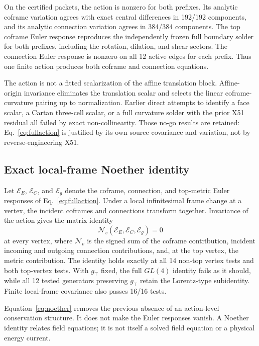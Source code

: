 \documentclass[11pt]{article}
\theoremstyle{definition}
\theoremstyle{remark}
\begin{document}
On the certified packets, the action is nonzero for both prefixes. Its analytic coframe variation agrees with exact central differences in 192/192 components, and its analytic connection variation agrees in 384/384 components. The top coframe Euler response reproduces the independently frozen full boundary solder for both prefixes, including the rotation, dilation, and shear sectors. The connection Euler response is nonzero on all 12 active edges for each prefix. Thus one finite action produces both coframe and connection equations.

The action is not a fitted scalarization of the affine translation block. Affine-origin invariance eliminates the translation scalar and selects the linear coframe-curvature pairing up to normalization. Earlier direct attempts to identify a face scalar, a Cartan three-cell scalar, or a full curvature solder with the prior X51 residual all failed by exact non-collinearity. Those no-go results are retained: Eq.~\eqref{eq:fullaction} is justified by its own source covariance and variation, not by reverse-engineering X51.

\subsection{Exact local-frame Noether identity}

Let $\mathcal E_E$, $\mathcal E_C$, and $\mathcal E_g$ denote the coframe, connection, and top-metric Euler responses of Eq.~\eqref{eq:fullaction}. Under a local infinitesimal frame change at a vertex, the incident coframes and connections transform together. Invariance of the action gives the matrix identity
\begin{equation}\label{eq:noether}
 \mathcal N_v(\mathcal E_E,\mathcal E_C,\mathcal E_g)=0
\end{equation}
at every vertex, where $\mathcal N_v$ is the signed sum of the coframe contribution, incident incoming and outgoing connection contributions, and, at the top vertex, the metric contribution. The identity holds exactly at all 14 non-top vertex tests and both top-vertex tests. With $g_\top$ fixed, the full $GL(4)$ identity fails as it should, while all 12 tested generators preserving $g_\top$ retain the Lorentz-type subidentity. Finite local-frame covariance also passes 16/16 tests.

Equation~\eqref{eq:noether} removes the previous absence of an action-level conservation structure. It does not make the Euler responses vanish. A Noether identity relates field equations; it is not itself a solved field equation or a physical energy current.
\end{document}
